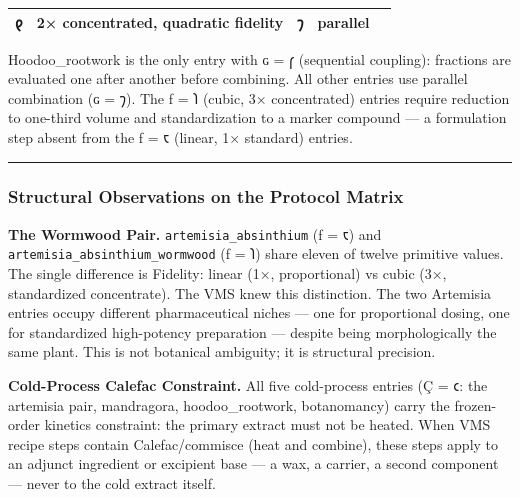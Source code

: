 \documentclass[12pt,a4paper]{article}
\begin{document}
\begin{longtable}[]{@{}lllll@{}}
\begin{minipage}[t]{0.17\columnwidth}
𐑞\strut
\end{minipage} & \begin{minipage}[t]{0.17\columnwidth}\raggedright
2× concentrated, quadratic fidelity\strut
\end{minipage} & \begin{minipage}[t]{0.17\columnwidth}\raggedright
𐑠\strut
\end{minipage} & \begin{minipage}[t]{0.17\columnwidth}\raggedright
parallel\strut
\end{minipage}\tabularnewline
\bottomrule
\end{longtable}

Hoodoo\_rootwork is the only entry with ɢ = 𐑝 (sequential coupling):
fractions are evaluated one after another before combining. All other
entries use parallel combination (ɢ = 𐑠). The ƒ = 𐑐 (cubic, 3×
concentrated) entries require reduction to one-third volume and
standardization to a marker compound --- a formulation step absent from
the ƒ = 𐑱 (linear, 1× standard) entries.

\begin{center}\rule{0.5\linewidth}{0.5pt}\end{center}

\hypertarget{structural-observations-on-the-protocol-matrix}{%
\subsubsection{Structural Observations on the Protocol
Matrix}\label{structural-observations-on-the-protocol-matrix}}

\textbf{The Wormwood Pair.} \texttt{artemisia\_absinthium} (ƒ = 𐑱) and
\texttt{artemisia\_absinthium\_wormwood} (ƒ = 𐑐) share eleven of twelve
primitive values. The single difference is Fidelity: linear (1×,
proportional) vs cubic (3×, standardized concentrate). The VMS knew this
distinction. The two Artemisia entries occupy different pharmaceutical
niches --- one for proportional dosing, one for standardized
high-potency preparation --- despite being morphologically the same
plant. This is not botanical ambiguity; it is structural precision.

\textbf{Cold-Process Calefac Constraint.} All five cold-process entries
(Ç = 𐑤: the artemisia pair, mandragora, hoodoo\_rootwork, botanomancy)
carry the frozen-order kinetics constraint: the primary extract must not
be heated. When VMS recipe steps contain Calefac/commisce (heat and
combine), these steps apply to an adjunct ingredient or excipient base
--- a wax, a carrier, a second component --- never to the cold extract
itself.
\end{document}
